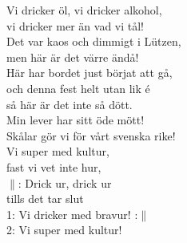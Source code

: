 \documentclass[a6paper,10pt]{article}
\begin{document}
\begin{center}
\end{center}
\begin{lyrics}
Vi dricker öl, vi dricker alkohol,\\
vi dricker mer än vad vi tål!\\
Det var kaos och dimmigt i Lützen,\\
men här är det värre ändå!\\
Här har bordet just börjat att gå,\\
och denna fest helt utan lik é\\
så här är det inte så dött.\\
Min lever har sitt öde mött!\\
Skålar gör vi för vårt svenska rike!\\
Vi super med kultur,\\
fast vi vet inte hur,\\
\newline
$\|$: Drick ur, drick ur\\
tills det tar slut\\
1: Vi dricker med bravur! :$\|$\\
2: Vi super med kultur!
\end{lyrics}
\end{document}
